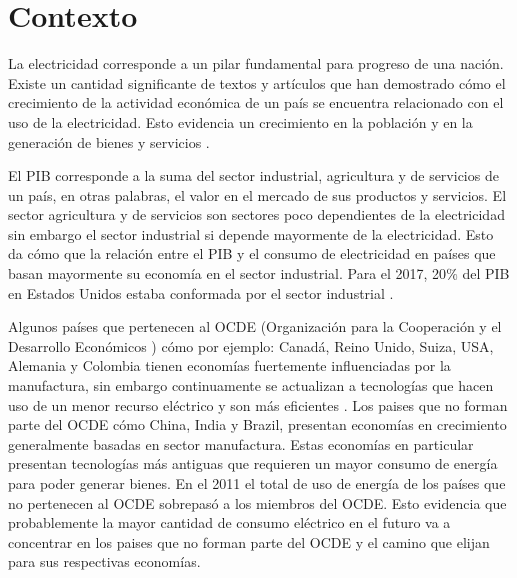 \documentclass{article}
\begin{document}
\section{Contexto}




La electricidad corresponde a un pilar fundamental para progreso de una nación.   Existe un cantidad significante de textos y artículos que han demostrado cómo el crecimiento  de la actividad económica de un país se encuentra relacionado con el uso de la electricidad. Esto evidencia un crecimiento en la población y en la generación de bienes y servicios \cite{chen_relationship_2007}. 

El PIB  corresponde a la suma del sector  industrial, agricultura y de servicios de un país, en otras palabras, el valor en el mercado de sus productos y servicios. El sector agricultura y de servicios son sectores poco dependientes de la electricidad sin embargo el sector industrial si depende mayormente de la electricidad. Esto da cómo que la relación entre el PIB y el consumo de electricidad en países que basan mayormente su economía en el sector industrial. Para el 2017, 20$\%$ del PIB en Estados Unidos estaba conformada por el sector industrial \cite{noauthor_why_2014}. 

Algunos países que pertenecen al OCDE (Organización para la Cooperación y el Desarrollo Económicos ) cómo por ejemplo: Canadá, Reino Unido, Suiza, USA, Alemania y Colombia tienen economías fuertemente influenciadas por  la manufactura, sin embargo continuamente se actualizan a tecnologías que hacen uso de un menor recurso eléctrico y son más eficientes \cite{noauthor_link_nodate}. Los paises que no forman parte del OCDE cómo China, India y Brazil, presentan economías en crecimiento generalmente basadas en sector manufactura. Estas economías en particular presentan tecnologías más antiguas que requieren un mayor consumo de energía para poder generar bienes. En el 2011 el total de uso de energía de los países que no pertenecen al OCDE sobrepasó a los miembros del OCDE. Esto evidencia que probablemente la mayor cantidad de consumo eléctrico en el futuro va a concentrar en los paises que no forman parte del OCDE y el camino que elijan para sus respectivas economías. 
\end{document}
